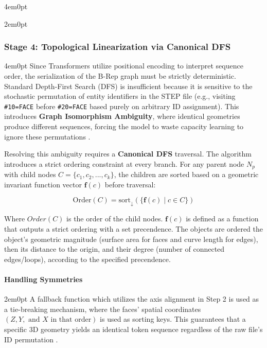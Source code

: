 \begin{indentedblock}{4em}{0pt}
\begin{indentedblock}{2em}{0pt}
					\end{indentedblock}
			\end{indentedblock}
		
		\subsubsection{Stage 4: Topological Linearization via Canonical DFS}
			\begin{indentedblock}{4em}{0pt}
				Since Transformers utilize positional encoding to interpret sequence order, the serialization of the B-Rep graph must be strictly deterministic. Standard Depth-First Search (DFS) is insufficient because it is sensitive to the stochastic permutation of entity identifiers in the STEP file (e.g., visiting \texttt{\#10=FACE} before \texttt{\#20=FACE} based purely on arbitrary ID assignment). This introduces \textbf{Graph Isomorphism Ambiguity}, where identical geometries produce different sequences, forcing the model to waste capacity learning to ignore these permutations \parencite{deepcad_wu}.
				
				
				Resolving this ambiguity requires a \textbf{Canonical DFS} traversal. The algorithm introduces a strict ordering constraint at every branch. For any parent node $N_p$ with child nodes $C = \{c_1, c_2, ..., c_k\}$, the children are sorted based on a geometric invariant function vector $\mathbf{f}(c)$ before traversal:
				
				\begin{equation}
					\text{Order}(C) = \text{sort}_{\downarrow}\left( \{ \mathbf{f}(c) \mid c \in C \} \right)
				\end{equation}
				
				Where $Order(C)$ is the order of the child nodes. $\mathbf{f}(c)$ is defined as a function that outputs a strict ordering with a set precendence. The objects are ordered the object's geometric magnitude (surface area for faces and curve length for edges), then its distance to the origin, and their degree (number of connected edges/loops), according to the specified precendence. 
				
				\paragraph{Handling Symmetries}
				\begin{indentedblock}{2em}{0pt}
					A fallback function which utilizes the axis alignment in Step 2 is used as a tie-breaking mechanism, where the faces' spatial coordinates $(Z, Y, \text{ and } X \text{ in that order})$ is used as sorting keys. This guarantees that a specific 3D geometry yields an identical token sequence regardless of the raw file's ID permutation \parencite{colligan_2022_hierarchical}.
				\end{indentedblock}
			\end{indentedblock}
	
